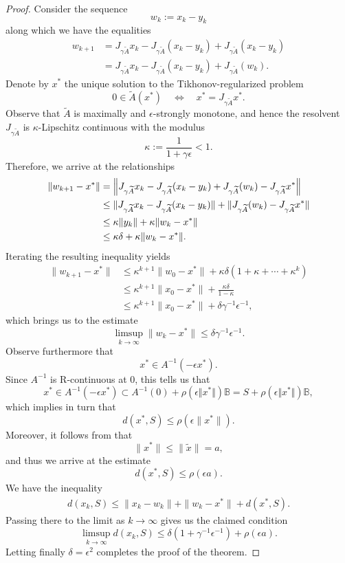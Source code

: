 \documentclass[12pt]{article}
\newcommand{\ball}{\mathbb{B}}
\theoremstyle{plain}
\begin{document}
\begin{proof}
Consider the sequence
\[
w_k:=x_k-y_k
\]
along which we have the equalities
\begin{align*}\nonumber
w_{k+1}
&=
J_{\gamma \widetilde{A}}x_k
-
J_{\gamma \widetilde{A}}(x_k-y_k)
+
J_{\gamma \widetilde{A}}(x_k-y_k) \\
&=
J_{\gamma \widetilde{A}}x_k
-
J_{\gamma \widetilde{A}}(x_k-y_k)
+
J_{\gamma \widetilde{A}}(w_k).
\end{align*}
Denote by $x^*$ the unique solution to the Tikhonov-regularized problem
\[
0\in \widetilde{A}(x^*)
\quad\Longleftrightarrow\quad
x^*=J_{\gamma \widetilde{A}}x^*.
\]
Observe that $\widetilde{A}$ is maximally and $\epsilon$-strongly monotone, and hence the resolvent $J_{\gamma \widetilde{A}}$ is $\kappa$-Lipschitz continuous with the modulus
\[
\kappa:=\frac{1}{1+\gamma\epsilon}<1.
\]
Therefore, we arrive at the relationships
\begin{align*}\nonumber
\|w_{k+1}-x^*\|
&=
\Bigl\|
J_{\gamma \widetilde{A}}x_k
-
J_{\gamma \widetilde{A}}(x_k-y_k)
+
J_{\gamma \widetilde{A}}(w_k)
-
J_{\gamma \widetilde{A}}x^*
\Bigr\| \\\nonumber
&\leq
\|J_{\gamma \widetilde{A}}x_k
-
J_{\gamma \widetilde{A}}(x_k-y_k)\|
+
\|J_{\gamma \widetilde{A}}(w_k)
-
J_{\gamma \widetilde{A}}x^*\| \\\nonumber
&\leq
\kappa\|y_k\|
+
\kappa\|w_k-x^*\| \\
&\leq
\kappa\delta+\kappa\|w_k-x^*\|.
\end{align*}
Iterating the resulting inequality yields
\begin{align*}\nonumber
\|w_{k+1}-x^*\|
&\leq
\kappa^{k+1}\|w_0-x^*\|
+
\kappa\delta(1+\kappa+\cdots+\kappa^k) \\\nonumber
&\leq
\kappa^{k+1}\|x_0-x^*\|
+
\frac{\kappa\delta}{1-\kappa} \\
&\leq
\kappa^{k+1}\|x_0-x^*\|
+
\delta\gamma^{-1}\epsilon^{-1},
\end{align*}
which brings us to the estimate
\[
\limsup_{k\to\infty}\|w_k-x^*\|
\leq
\delta\gamma^{-1}\epsilon^{-1}.
\]
Observe furthermore that
\[
x^*\in A^{-1}(-\epsilon x^*).
\]
Since $A^{-1}$ is R-continuous at $0$, {this} tells us that
$$
x^*\in A^{-1}(-\epsilon x^*)\subset A^{-1}(0)+\rho(\epsilon \Vert x^* \Vert)\ball=S+\rho(\epsilon \Vert x^* \Vert)\ball,
$$
which implies in turn that
\[
d(x^*,S)
\leq
\rho(\epsilon\|x^*\|).
\]
Moreover, it follows from \cite{L1} that
\[
\|x^*\|
\leq
\|\widetilde{x}\|
=
a,
\]
and thus we arrive at the estimate
\[
d(x^*,S)\leq \rho(\epsilon a).
\]
We have the inequality
\begin{align*}
d(x_k,S)
\leq
\|x_k-w_k\|
+
\|w_k-x^*\|
+
d(x^*,S). 
\end{align*}
Passing there to the limit as $k\to\infty$ gives us the claimed condition
$$
\limsup_{k\to\infty} d(x_k,S)\leq
\delta(1+
\gamma^{-1}\epsilon^{-1})
+
 \rho(\epsilon a).
$$
Letting finally $\delta= \epsilon^2$ completes the proof of the theorem.
\end{proof}
\end{document}
